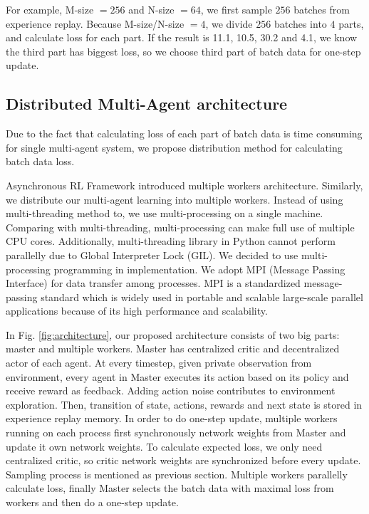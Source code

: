 \documentclass[11pt,twocolumn]{jarticle} %
\begin{document}
For example, M-size $= 256$ and N-size $= 64$, we first sample $256$ batches from experience replay. Because M-size/N-size $= 4$, we divide $256$ batches into $4$ parts, and calculate loss for each part. If the result is 11.1, 10.5, 30.2 and 4.1, we know the third part has biggest loss, so we choose third part of batch data for one-step update. 

\subsection{Distributed Multi-Agent architecture}

Due to the fact that calculating loss of each part of batch data is time consuming for single multi-agent system, we propose distribution method for calculating batch data loss. \par 
Asynchronous RL Framework\cite{a3c} introduced multiple workers architecture. Similarly, we distribute our multi-agent learning into multiple workers. Instead of using multi-threading method to, we use multi-processing on a single machine. Comparing with multi-threading, multi-processing can make full use of multiple CPU cores. Additionally, multi-threading library in Python cannot perform parallelly due to Global Interpreter Lock (GIL). We decided to use multi-processing programming in implementation. We adopt MPI (Message Passing Interface) for data transfer among processes. MPI is a standardized message-passing standard which is widely used in portable and scalable large-scale parallel applications because of its high performance and scalability. \par
In Fig. \ref{fig:architecture}, our proposed architecture consists of two big parts: master and multiple workers. Master has centralized critic and decentralized actor of each agent. At every timestep, given private observation from environment, every agent in Master executes its action based on its policy and receive reward as feedback. Adding action noise contributes to environment exploration. Then, transition of state, actions, rewards and next state is stored in experience replay memory. In order to do one-step update, multiple workers running on each process first synchronously network weights from Master and update it own network weights. To calculate expected loss, we only need centralized critic, so critic network weights are synchronized before every update. Sampling process is mentioned as previous section. Multiple workers parallelly calculate loss, finally Master selects the batch data with maximal loss from workers and then do a one-step update. \par
\end{document}
